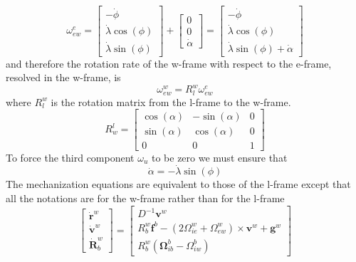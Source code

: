 $$
\omega_{ew}^e = \begin{bmatrix}
    -\dot\phi \\
    \dot\lambda \cos(\phi) \\
    \dot\lambda \sin(\phi)
\end{bmatrix} + \begin{bmatrix}
    0\\
    0\\
    \dot \alpha
\end{bmatrix} = \begin{bmatrix}
    -\dot\phi \\
    \dot\lambda \cos(\phi) \\
    \dot\lambda \sin(\phi) + \dot \alpha
\end{bmatrix}
$$
and therefore the rotation rate of the w-frame with respect to the e-frame, resolved in the w-frame, is
\begin{equation}
    \omega_{ew}^w = R_l^w \omega_{ew}^e 
\end{equation}
where $R_l^w$ is the rotation matrix from the l-frame to the w-frame.
\begin{equation}
    R_w^l = \begin{bmatrix}
        \cos(\alpha) & -\sin(\alpha) & 0 \\
        \sin(\alpha) & \cos(\alpha) & 0 \\
        0 & 0 & 1
    \end{bmatrix}
\end{equation}
To force the third component $\omega_u$ to be zero we must ensure that
\begin{equation}
    \dot \alpha = -\dot\lambda \sin(\phi)
\end{equation}
The mechanization equations are equivalent to those of the l-frame except that
all the notations are for the w-frame rather than for the l-frame
\begin{equation}
    \begin{bmatrix}
        \dot{\bm{r}}^w \\
        \dot{\bm{v}}^w \\
        \dot{\bm{R}}^w_b
    \end{bmatrix}
    = \begin{bmatrix}
        D^{-1}\bm{v}^w \\[1em]
        R^w_b\bm{f}^b - (2\Omega_{ie}^w + \Omega_{ew}^w)\times \bm{v}^w + \bm{g}^w \\[1em]
        R^w_b(\bm{\Omega}_{ib}^b - \Omega_{iw}^b)
    \end{bmatrix}
\end{equation}